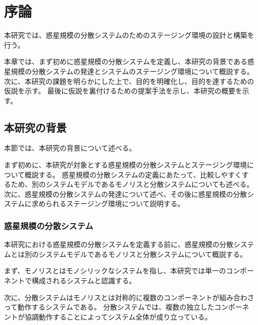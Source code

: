 \chapter{序論}
\label{introduction}

本研究では、惑星規模の分散システムのためのステージング環境の設計と構築を行う。

本章では、まず初めに惑星規模の分散システムを定義し、本研究の背景である惑星規模の分散システムの発達とシステムのステージング環境について概説する。
次に、本研究の課題を明らかにした上で、目的を明確化し、目的を達するための仮説を示す。
最後に仮説を裏付けるための提案手法を示し、本研究の概要を示す。

\section{本研究の背景}
\label{introduction:background}

本節では、本研究の背景について述べる。

まず初めに、本研究が対象とする惑星規模の分散システムとステージング環境について概説する。
惑星規模の分散システムの定義にあたって、比較しやすくするため、別のシステムモデルであるモノリスと分散システムについても述べる。
次に、惑星規模の分散システムの発達について述べ、その後に惑星規模の分散システムに求められるステージング環境について説明する。

\subsection{惑星規模の分散システム}

本研究における惑星規模の分散システムを定義する前に、惑星規模の分散システムとは別のシステムモデルであるモノリスと分散システムについて概説する。

まず、モノリスとはモノシリックなシステムを指し、本研究では単一のコンポーネントで構成されるシステムと認識する。

次に、分散システムはモノリスとは対称的に複数のコンポーネントが組み合わさって動作するシステムである。
分散システムでは、複数の独立したコンポーネントが協調動作することによってシステム全体が成り立っている。

